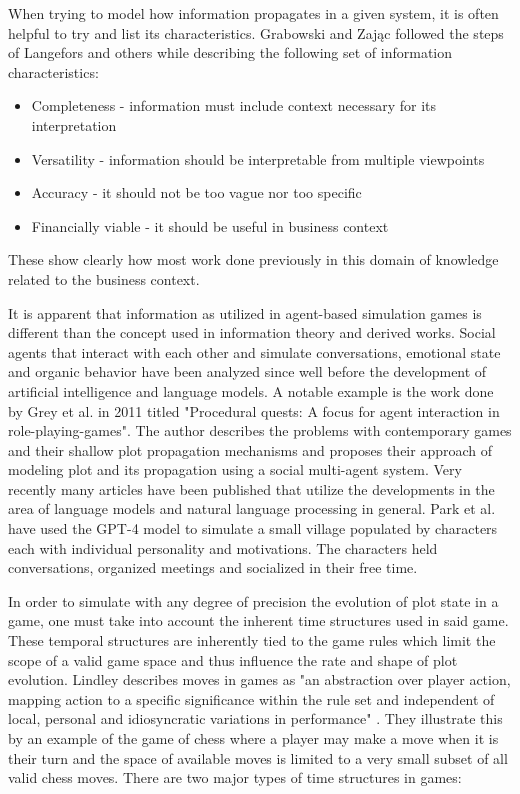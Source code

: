 When trying to model how information propagates in a given system, it is often helpful to try and list its characteristics.
Grabowski and Zając followed the steps of Langefors and others while describing the following set of information characteristics:
\begin{itemize}
    \item Completeness - information must include context necessary for its interpretation
    \item Versatility - information should be interpretable from multiple viewpoints
    \item Accuracy - it should not be too vague nor too specific
    \item Financially viable - it should be useful in business context
\end{itemize}
These show clearly how most work done previously in this domain of knowledge related to the business context.

It is apparent that information as utilized in agent-based simulation games is different than the concept used in information theory and derived works.
Social agents that interact with each other and simulate conversations, emotional state and organic behavior have been analyzed since well before the development of artificial intelligence and language models.
A notable example is the work done by Grey et al. in 2011 titled "Procedural quests: A focus for agent interaction in role-playing-games"\cite{grey2011procedural}.
The author describes the problems with contemporary games and their shallow plot propagation mechanisms and proposes their approach of modeling plot and its propagation using a social multi-agent system.
Very recently many articles have been published that utilize the developments in the area of language models and natural language processing in general.
Park et al.\cite{park2023generative} have used the GPT-4 model\cite{openai2023gpt4} to simulate a small village populated by characters each with individual personality and motivations.
The characters held conversations, organized meetings and socialized in their free time.

In order to simulate with any degree of precision the evolution of plot state in a game, one must take into account the inherent time structures used in said game.
These temporal structures are inherently tied to the game rules which limit the scope of a valid game space and thus influence the rate and shape of plot evolution.
Lindley describes moves in games as "an abstraction over player action, mapping action to a specific significance within the rule set and independent of local, personal and idiosyncratic variations in performance" \cite{lindley2005story}.
They illustrate this by an example of the game of chess where a player may make a move when it is their turn and the space of available moves is limited to a very small subset of all valid chess moves.
There are two major types of time structures in games:

